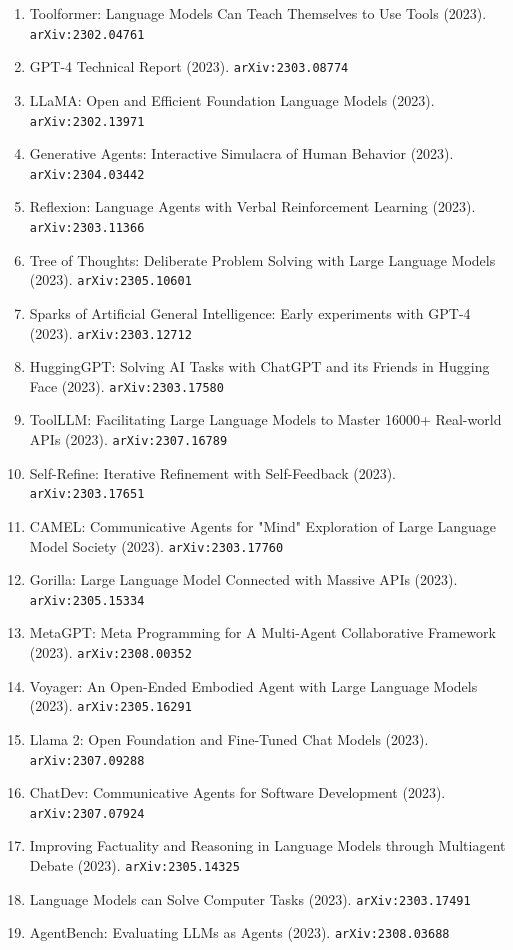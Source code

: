\documentclass[11pt]{article}
\begin{document}
\begin{enumerate}
  \item Toolformer: Language Models Can Teach Themselves to Use Tools (2023). \texttt{arXiv:2302.04761}
  \item GPT-4 Technical Report (2023). \texttt{arXiv:2303.08774}
  \item LLaMA: Open and Efficient Foundation Language Models (2023). \texttt{arXiv:2302.13971}
  \item Generative Agents: Interactive Simulacra of Human Behavior (2023). \texttt{arXiv:2304.03442}
  \item Reflexion: Language Agents with Verbal Reinforcement Learning (2023). \texttt{arXiv:2303.11366}
  \item Tree of Thoughts: Deliberate Problem Solving with Large Language Models (2023). \texttt{arXiv:2305.10601}
  \item Sparks of Artificial General Intelligence: Early experiments with GPT-4 (2023). \texttt{arXiv:2303.12712}
  \item HuggingGPT: Solving AI Tasks with ChatGPT and its Friends in Hugging
  Face (2023). \texttt{arXiv:2303.17580}
  \item ToolLLM: Facilitating Large Language Models to Master 16000+ Real-world
  APIs (2023). \texttt{arXiv:2307.16789}
  \item Self-Refine: Iterative Refinement with Self-Feedback (2023). \texttt{arXiv:2303.17651}
  \item CAMEL: Communicative Agents for "Mind" Exploration of Large Language
  Model Society (2023). \texttt{arXiv:2303.17760}
  \item Gorilla: Large Language Model Connected with Massive APIs (2023). \texttt{arXiv:2305.15334}
  \item MetaGPT: Meta Programming for A Multi-Agent Collaborative Framework (2023). \texttt{arXiv:2308.00352}
  \item Voyager: An Open-Ended Embodied Agent with Large Language Models (2023). \texttt{arXiv:2305.16291}
  \item Llama 2: Open Foundation and Fine-Tuned Chat Models (2023). \texttt{arXiv:2307.09288}
  \item ChatDev: Communicative Agents for Software Development (2023). \texttt{arXiv:2307.07924}
  \item Improving Factuality and Reasoning in Language Models through Multiagent
  Debate (2023). \texttt{arXiv:2305.14325}
  \item Language Models can Solve Computer Tasks (2023). \texttt{arXiv:2303.17491}
  \item AgentBench: Evaluating LLMs as Agents (2023). \texttt{arXiv:2308.03688}

\end{enumerate}
\end{document}
